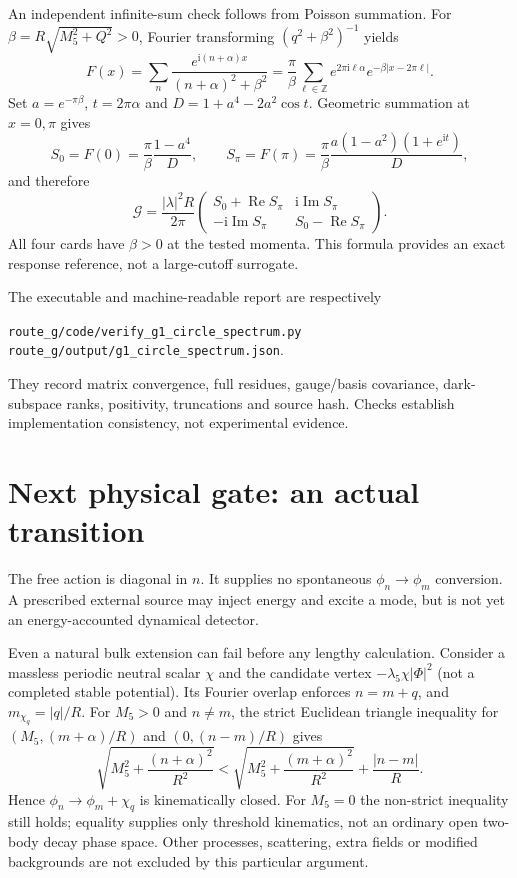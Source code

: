 \documentclass[11pt,a4paper]{article}
\newcommand{\ii}{\mathrm{i}}
\newcommand{\cG}{\mathcal G}
\begin{document}
An independent infinite-sum check follows from Poisson summation.
For $\beta=R\sqrt{M_5^2+Q^2}>0$, Fourier transforming
$(q^2+\beta^2)^{-1}$ yields
\begin{equation}
 F(x)=\sum_n\frac{e^{\ii(n+\alpha)x}}{(n+\alpha)^2+\beta^2}
 =\frac{\pi}{\beta}\sum_{\ell\in\mathbb Z}
 e^{2\pi\ii\ell\alpha}e^{-\beta|x-2\pi\ell|}.
\end{equation}
Set $a=e^{-\pi\beta}$, $t=2\pi\alpha$ and
$D=1+a^4-2a^2\cos t$. Geometric summation at $x=0,\pi$ gives
\begin{equation}
 S_0=F(0)=\frac{\pi}{\beta}\frac{1-a^4}{D},\qquad
 S_\pi=F(\pi)=\frac{\pi}{\beta}
       \frac{a(1-a^2)(1+e^{\ii t})}{D},
\end{equation}
and therefore
\begin{equation}
 \cG=\frac{|\lambda|^2R}{2\pi}
 \begin{pmatrix}
 S_0+\operatorname{Re}S_\pi & \ii\operatorname{Im}S_\pi\\
 -\ii\operatorname{Im}S_\pi & S_0-\operatorname{Re}S_\pi
 \end{pmatrix}.
\end{equation}
All four cards have $\beta>0$ at the tested momenta. This formula
provides an exact response reference, not a large-cutoff surrogate.

The executable and machine-readable report are respectively
\begin{center}\small
\texttt{route\_g/code/verify\_g1\_circle\_spectrum.py}\\
\texttt{route\_g/output/g1\_circle\_spectrum.json}.
\end{center}
They record matrix convergence, full residues, gauge/basis covariance,
dark-subspace ranks, positivity, truncations and source hash.
Checks establish implementation consistency, not experimental evidence.

\section{Next physical gate: an actual transition}
The free action is diagonal in $n$. It supplies no spontaneous
$\phi_n\to\phi_m$ conversion. A prescribed external source may inject
energy and excite a mode, but is not yet an energy-accounted dynamical
detector.

Even a natural bulk extension can fail before any lengthy calculation.
Consider a massless periodic neutral scalar $\chi$ and the candidate
vertex $-\lambda_5\chi|\Phi|^2$ (not a completed stable potential).
Its Fourier overlap enforces
$n=m+q$, and $m_{\chi_q}=|q|/R$. For $M_5>0$ and $n\ne m$,
the strict Euclidean triangle inequality for
$(M_5,(m+\alpha)/R)$ and $(0,(n-m)/R)$ gives
\begin{equation}\label{eq:closed}
 \sqrt{M_5^2+\frac{(n+\alpha)^2}{R^2}}
 <
 \sqrt{M_5^2+\frac{(m+\alpha)^2}{R^2}}+
 \frac{|n-m|}{R}.
\end{equation}
Hence $\phi_n\to\phi_m+\chi_q$ is kinematically closed.
For $M_5=0$ the non-strict inequality still holds; equality supplies
only threshold kinematics, not an ordinary open two-body decay
phase space. Other processes, scattering, extra fields or modified
backgrounds are not excluded by this particular argument.
\end{document}
